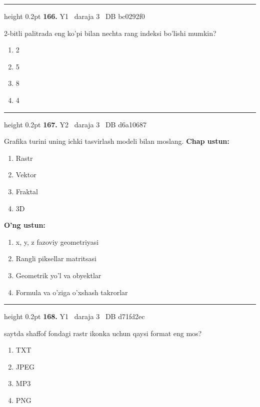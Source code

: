 \documentclass[10pt,a4paper,oneside]{article}
\begin{document}
\vspace{2mm}\hrule height 0.2pt \vspace{4mm}
\hypertarget{q166}{\textbf{\color{ink}166.}}  {\color{muted}\scriptsize Y1 \textbullet\ daraja 3 \textbullet\ DB bc0292f0}
\par
2-bitli palitrada eng ko'pi bilan nechta rang indeksi bo'lishi mumkin?
\begin{enumerate}[label=\Alph*),leftmargin=9mm]
\item 2
\item 5
\item 8
\item 4
\end{enumerate}
\vspace{2mm}\hrule height 0.2pt \vspace{4mm}
\hypertarget{q167}{\textbf{\color{ink}167.}}  {\color{muted}\scriptsize Y2 \textbullet\ daraja 3 \textbullet\ DB d6a10687}
\par
Grafika turini uning ichki tasvirlash modeli bilan moslang.
\textbf{\footnotesize Chap ustun:}
\begin{enumerate}[label=\arabic*),leftmargin=9mm]
\item Rastr
\item Vektor
\item Fraktal
\item 3D
\end{enumerate}
\textbf{\footnotesize O'ng ustun:}
\begin{enumerate}[label=\Alph*),leftmargin=9mm]
\item x, y, z fazoviy geometriyasi
\item Rangli piksellar matritsasi
\item Geometrik yo'l va obyektlar
\item Formula va o'ziga o'xshash takrorlar
\end{enumerate}
\vspace{2mm}\hrule height 0.2pt \vspace{4mm}
\hypertarget{q168}{\textbf{\color{ink}168.}}  {\color{muted}\scriptsize Y1 \textbullet\ daraja 3 \textbullet\ DB d71fd2ec}
\par
saytda shaffof fondagi rastr ikonka uchun qaysi format eng mos?
\begin{enumerate}[label=\Alph*),leftmargin=9mm]
\item TXT
\item JPEG
\item MP3
\item PNG
\end{enumerate}
\end{document}
